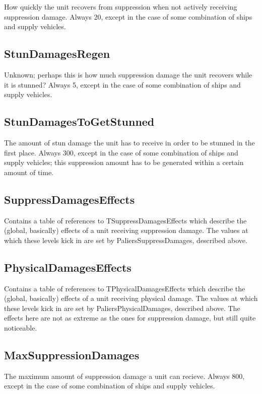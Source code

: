 \documentclass{article}
\begin{document}
How quickly the unit recovers from suppression when not actively receiving suppression damage. Always 20, except in the case of some combination of ships and supply vehicles.

\subsection{StunDamagesRegen}

Unknown; perhaps this is how much suppression damage the unit recovers while it is stunned? Always 5, except in the case of some combination of ships and supply vehicles.

\subsection{StunDamagesToGetStunned}

The amount of stun damage the unit has to receive in order to be stunned in the first place. Always 300, except in the case of some combination of ships and supply vehicles; this suppression amount has to be generated within a certain amount of time.

\subsection{SuppressDamagesEffects}

Contains a table of references to TSuppressDamagesEffects which describe the (global, basically) effects of a unit receiving suppression damage. The values at which these levels kick in are set by PaliersSuppressDamages, described above.

\subsection{PhysicalDamagesEffects}

Contains a table of references to TPhysicalDamagesEffects which describe the (global, basically) effects of a unit receiving physical damage. The values at which these levels kick in are set by PaliersPhysicalDamages, described above. The effects here are not as extreme as the ones for suppression damage, but still quite noticeable.

\subsection{MaxSuppressionDamages}

The maximum amount of suppression damage a unit can recieve. Always 800, except in the case of some combination of ships and supply vehicles.
\end{document}
